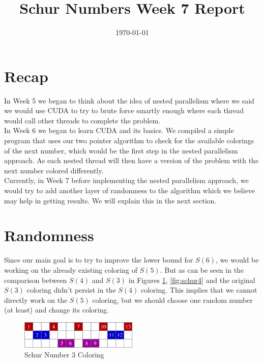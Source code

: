 \documentclass[12pt]{article}
\begin{document}
\title{Schur Numbers Week 7 Report}
\date{\today}

\tableofcontents
\newpage
\maketitle

\section{Recap}
In Week 5 we began to think about the idea of nested parallelism where we said we would use CUDA to try to brute force smartly enough where each thread
would call other threads to complete the problem. \\ 

In Week 6 we began to learn CUDA and its basics. We compiled a simple program that uses our two pointer algorithm to check for the available colorings of the next number, which would be the first step in the nested parallelism approach. As each nested thread will then have a version of the problem with the next number colored differently. \\ 

Currently, in Week 7 before implementing the nested parallelism approach, we would try to add another layer of randomness to the algorithm which we believe may help in getting results. We will explain this in the next section.

\section{Randomness}

Since our main goal is to try to improve the lower bound for $S(6)$, we would be working on the already existing coloring of $S(5)$. But as can be seen in the comparison between $S(4)$ and $S(3)$ in Figures \ref{fig:schur3}, \ref{fig:schur4} and  the original $S(3)$ coloring didn't persist in the $S(4)$ coloring. This implies that we cannot directly work on the $S(5)$ coloring, but we should choose one random number (at least) and change its coloring.

\begin{figure}[h!]
    \centering
    \includegraphics[width=0.5\textwidth]{schur_three.png}
    \caption{Schur Number 3 Coloring}
    \label{fig:schur3}
\end{figure}    
\end{document}
